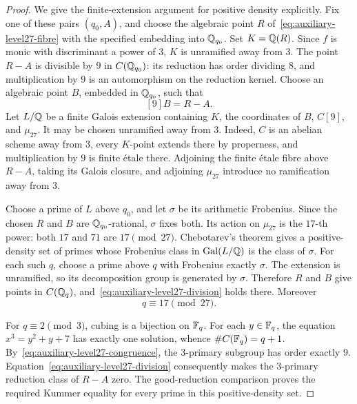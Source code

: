 \begin{proof}
We give the finite-extension argument for positive density explicitly.
Fix one of these pairs \((q_0,A)\), and choose the algebraic point
\(R\) of~\eqref{eq:auxiliary-level27-fibre} with the specified embedding into \(\mathbb Q_{q_0}\).
Set \(K=\mathbb Q(R)\). Since \(f\) is monic with discriminant a power of
\(3\), \(K\) is unramified away from \(3\).
The point \(R-A\) is divisible by \(9\) in \(C(\mathbb Q_{q_0})\):
its reduction has order dividing \(8\), and multiplication by \(9\)
is an automorphism on the reduction kernel. Choose an algebraic
point \(B\), embedded in \(\mathbb Q_{q_0}\), such that
\begin{equation}\label{eq:auxiliary-level27-division}
 [9]B=R-A.
\end{equation}
Let \(L/\mathbb Q\) be a finite Galois extension containing
\(K\), the coordinates of \(B\), \(C[9]\), and \(\mu_{27}\).
It may be chosen unramified away from \(3\). Indeed, \(C\) is an
abelian scheme away from \(3\), every \(K\)-point extends there by
properness, and multiplication by \(9\) is finite \'etale there.
Adjoining the finite \'etale fibre above \(R-A\), taking its Galois
closure, and adjoining \(\mu_{27}\) introduce no ramification
away from \(3\).

Choose a prime of \(L\) above \(q_0\), and let \(\sigma\) be its
arithmetic Frobenius. Since the chosen \(R\) and \(B\) are
\(\mathbb Q_{q_0}\)-rational, \(\sigma\) fixes both. Its action on
\(\mu_{27}\) is the \(17\)-th power: both \(17\) and \(71\) are
\(17\pmod {27}\).
Chebotarev's theorem
\cite[Chapter I, \S2.2, pp.~I-7--I-8]{Serre1989}
gives a positive-density set of primes whose Frobenius class in
\(\operatorname{Gal}(L/\mathbb Q)\) is the class of \(\sigma\).
For each such \(q\), choose a prime above \(q\) with Frobenius
exactly \(\sigma\). The extension is unramified, so its decomposition
group is generated by \(\sigma\). Therefore \(R\) and \(B\) give
points in \(C(\mathbb Q_q)\), and~\eqref{eq:auxiliary-level27-division} holds there. Moreover
\begin{equation}\label{eq:auxiliary-level27-congruence}
 q\equiv17\pmod {27}.
\end{equation}

For \(q\equiv2\pmod3\), cubing is a bijection on \(\mathbb F_q\).
For each \(y\in\mathbb F_q\), the equation \(x^3=y^2+y+7\) has exactly one
solution, whence \(\#C(\mathbb F_q)=q+1\).
By~\eqref{eq:auxiliary-level27-congruence}, the \(3\)-primary subgroup has order exactly \(9\).
Equation~\eqref{eq:auxiliary-level27-division} consequently makes the \(3\)-primary reduction class
of \(R-A\) zero. The good-reduction comparison proves the required
Kummer equality for every prime in this positive-density set.
\end{proof}

